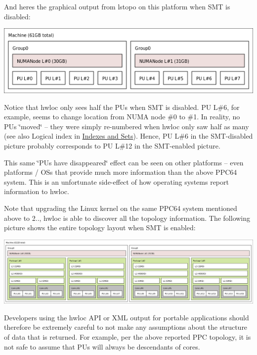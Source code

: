 And here\textquotesingle{}s the graphical output from lstopo on this platform when S\+MT is disabled\+:

 
\begin{DoxyImageNoCaption}
  \mbox{\includegraphics[width=.5\textwidth]{ppc64-without-smt.png}}
\end{DoxyImageNoCaption}


Notice that hwloc only sees half the P\+Us when S\+MT is disabled. PU L\#6, for example, seems to change location from N\+U\+MA node \#0 to \#1. In reality, no P\+Us \char`\"{}moved\char`\"{} -- they were simply re-\/numbered when hwloc only saw half as many (see also Logical index in \hyperlink{a00380_termsanddefs_indexes}{Indexes and Sets}). Hence, PU L\#6 in the S\+M\+T-\/disabled picture probably corresponds to PU L\#12 in the S\+M\+T-\/enabled picture.

This same \char`\"{}\+P\+Us have disappeared\char`\"{} effect can be seen on other platforms -- even platforms / O\+Ss that provide much more information than the above P\+P\+C64 system. This is an unfortunate side-\/effect of how operating systems report information to hwloc.

Note that upgrading the Linux kernel on the same P\+P\+C64 system mentioned above to 2.., hwloc is able to discover all the topology information. The following picture shows the entire topology layout when S\+MT is enabled\+:

 
\begin{DoxyImageNoCaption}
  \mbox{\includegraphics[width=\textwidth]{ppc64-full-with-smt.png}}
\end{DoxyImageNoCaption}


Developers using the hwloc A\+PI or X\+ML output for portable applications should therefore be extremely careful to not make any assumptions about the structure of data that is returned. For example, per the above reported P\+PC topology, it is not safe to assume that P\+Us will always be descendants of cores.

